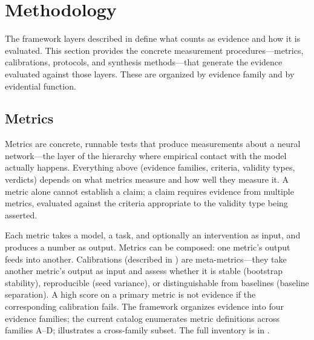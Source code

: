 \documentclass{article}
\begin{document}
\section{Methodology}
\label{sec:methodology}

The framework layers described in  define what counts as evidence and how it is evaluated. This section provides the concrete measurement procedures---metrics, calibrations, protocols, and synthesis methods---that generate the evidence evaluated against those layers. These are organized by evidence family and by evidential function.

\subsection{Metrics}
\label{sec:metrics}

Metrics are concrete, runnable tests that produce measurements about a neural network---the layer of the hierarchy where empirical contact with the model actually happens. Everything above (evidence families, criteria, validity types, verdicts) depends on what metrics measure and how well they measure it. A metric alone cannot establish a claim; a claim requires evidence from multiple metrics, evaluated against the criteria appropriate to the validity type being asserted.

Each metric takes a model, a task, and optionally an intervention as input, and produces a number as output. Metrics can be composed: one metric's output feeds into another. Calibrations (described in ) are meta-metrics---they take another metric's output as input and assess whether it is stable (bootstrap stability), reproducible (seed variance), or distinguishable from baselines (baseline separation). A high score on a primary metric is not evidence if the corresponding calibration fails. The framework organizes evidence into four evidence families; the current catalog enumerates metric definitions across families A--D;  illustrates a cross-family subset. The full inventory is in .
\end{document}
